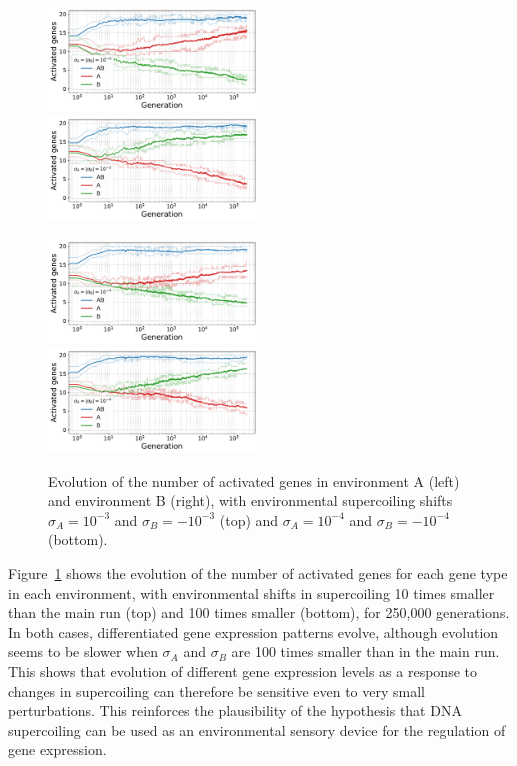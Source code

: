 \begin{figure}[H]
\centering
\includegraphics[width=0.495\textwidth]{param/sigma/sigma-1e-3/gene_activity_env_A.pdf}
\includegraphics[width=0.495\textwidth]{param/sigma/sigma-1e-3/gene_activity_env_B.pdf}

\includegraphics[width=0.495\textwidth]{param/sigma/sigma-1e-4/gene_activity_env_A.pdf}
\includegraphics[width=0.495\textwidth]{param/sigma/sigma-1e-4/gene_activity_env_B.pdf}
\caption[Evolution of the number of activated genes in each environment, with decreasing environmental supercoiling shifts]{Evolution of the number of activated genes in environment A (left) and environment B (right), with environmental supercoiling shifts $\sigma_A = 10^{-3}$ and $\sigma_B = -10^{-3}$ (top) and $\sigma_A = 10^{-4}$ and $\sigma_B = -10^{-4}$ (bottom).}
\label{fig:param:sigma-activ-by-env}
\end{figure}

Figure~\ref{fig:param:sigma-activ-by-env} shows the evolution of the number of activated genes for each gene type in each environment, with environmental shifts in supercoiling 10 times smaller than the main run (top) and 100 times smaller (bottom), for 250,000 generations.
In both cases, differentiated gene expression patterns evolve, although evolution seems to be slower when $\sigma_A$ and $\sigma_B$ are 100 times smaller than in the main run.
This shows that evolution of different gene expression levels as a response to changes in supercoiling can therefore be sensitive even to very small perturbations.
This reinforces the plausibility of the hypothesis that DNA supercoiling can be used as an environmental sensory device for the regulation of gene expression.

